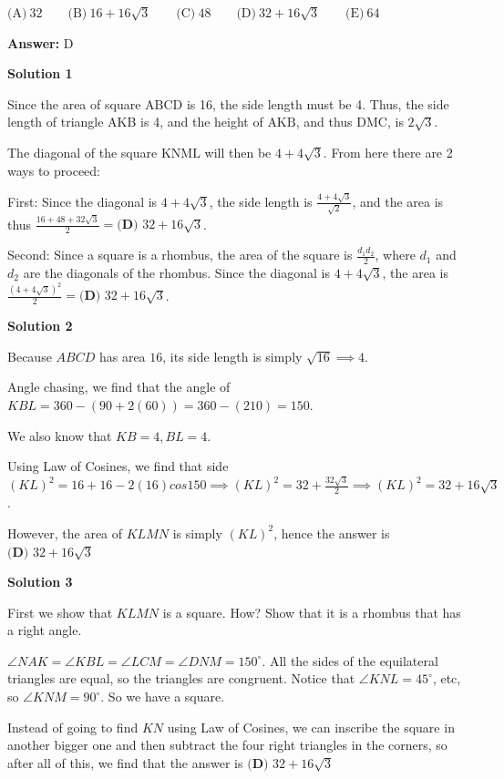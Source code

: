 \begin{enumerate}
$\textrm{(A)}\ 32\qquad\textrm{(B)}\ 16+16\sqrt{3}\qquad\textrm{(C)}\ 48\qquad\textrm{(D)}\ 32+16\sqrt{3}\qquad\textrm{(E)}\ 64$

 \textbf{Answer: }D



\textbf{Solution 1}

Since the area of square $\text{ABCD}$ is 16, the side length must be 4. Thus, the side length of triangle AKB is 4, and the height of $\text{AKB}$, and thus $\text{DMC}$, is $2\sqrt{3}$. 

 The diagonal of the square $\text{KNML}$ will then be $4+4\sqrt{3}$. From here there are 2 ways to proceed:

 First: Since the diagonal is $4+4\sqrt{3}$, the side length is $\frac{4+4\sqrt{3}}{\sqrt{2}}$, and the area is thus $\frac{16+48+32\sqrt{3}}{2}=\boxed{\textbf{(D) } 32+16\sqrt{3}}$.

 Second: Since a square is a rhombus, the area of the square is $\frac{d_1d_2}{2}$, where $d_1$ and $d_2$ are the diagonals of the rhombus. Since the diagonal is $4+4\sqrt{3}$, the area is $\frac{(4+4\sqrt{3})^2}{2}=\boxed{\textbf{(D) } 32+16\sqrt{3}}$.

 



\textbf{Solution 2}

Because $ABCD$ has area $16$, its side length is simply $\sqrt{16}\implies 4$.

 Angle chasing, we find that the angle of $KBL=360-(90+2(60))=360-(210)=150$.

 We also know that $KB=4, BL=4$.

 Using Law of Cosines, we find that side $(KL)^2=16+16-2(16)cos{150}\implies (KL)^2=32+\frac{32\sqrt{3}}{2}\implies (KL)^2=32+16\sqrt{3}$.

 However, the area of $KLMN$ is simply $(KL)^2$, hence the answer is $\boxed{\textbf{(D) } 32+16\sqrt{3}}$




\textbf{Solution 3}

First we show that $KLMN$ is a square. How? Show that it is a rhombus that has a right angle.

 $\angle{NAK}=\angle{KBL}=\angle{LCM}=\angle{DNM}=150^\circ$. All the sides of the equilateral triangles are equal, so the triangles are congruent. Notice that $\angle{KNL}=45^\circ$, etc, so $\angle{KNM}=90^\circ$. So we have a square.

 Instead of going to find $KN$ using Law of Cosines, we can inscribe the square in another bigger one and then subtract the four right triangles in the corners, so after all of this, we find that the answer is $\boxed{\textbf{(D) } 32+16\sqrt{3}}$




\end{enumerate}
